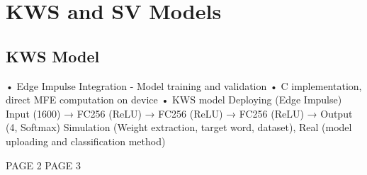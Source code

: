 \chapter{KWS and SV Models}
\label{cha:training} 
\section{KWS Model}
\label{sec:kws deployment}
• Edge Impulse Integration - Model training and validation\newline
• C implementation, direct MFE computation on device\newline
• KWS model Deploying (Edge Impulse)\newline
Input (1600) → FC256 (ReLU) → FC256 (ReLU) → FC256 (ReLU) → Output (4, Softmax)\newline
Simulation (Weight extraction, target word, dataset), Real (model uploading and classification method)\newline

\newpage
PAGE 2
\newpage
PAGE 3
\newpage
